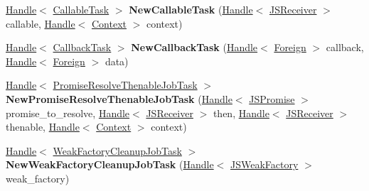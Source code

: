 \begin{DoxyCompactItemize}
\mbox{\hyperlink{classv8_1_1internal_1_1Handle}{Handle}}$<$ \mbox{\hyperlink{classv8_1_1internal_1_1CallableTask}{Callable\+Task}} $>$ {\bfseries New\+Callable\+Task} (\mbox{\hyperlink{classv8_1_1internal_1_1Handle}{Handle}}$<$ \mbox{\hyperlink{classv8_1_1internal_1_1JSReceiver}{J\+S\+Receiver}} $>$ callable, \mbox{\hyperlink{classv8_1_1internal_1_1Handle}{Handle}}$<$ \mbox{\hyperlink{classv8_1_1internal_1_1Context}{Context}} $>$ context)
\item 
\mbox{\label{classv8_1_1internal_1_1Factory_a652145336bb3edb0824d0aa5c55b48ac}} 
\mbox{\hyperlink{classv8_1_1internal_1_1Handle}{Handle}}$<$ \mbox{\hyperlink{classv8_1_1internal_1_1CallbackTask}{Callback\+Task}} $>$ {\bfseries New\+Callback\+Task} (\mbox{\hyperlink{classv8_1_1internal_1_1Handle}{Handle}}$<$ \mbox{\hyperlink{classv8_1_1internal_1_1Foreign}{Foreign}} $>$ callback, \mbox{\hyperlink{classv8_1_1internal_1_1Handle}{Handle}}$<$ \mbox{\hyperlink{classv8_1_1internal_1_1Foreign}{Foreign}} $>$ data)
\item 
\mbox{\label{classv8_1_1internal_1_1Factory_a1bb189493baa3a061447014fd77caed9}} 
\mbox{\hyperlink{classv8_1_1internal_1_1Handle}{Handle}}$<$ \mbox{\hyperlink{classv8_1_1internal_1_1PromiseResolveThenableJobTask}{Promise\+Resolve\+Thenable\+Job\+Task}} $>$ {\bfseries New\+Promise\+Resolve\+Thenable\+Job\+Task} (\mbox{\hyperlink{classv8_1_1internal_1_1Handle}{Handle}}$<$ \mbox{\hyperlink{classv8_1_1internal_1_1JSPromise}{J\+S\+Promise}} $>$ promise\+\_\+to\+\_\+resolve, \mbox{\hyperlink{classv8_1_1internal_1_1Handle}{Handle}}$<$ \mbox{\hyperlink{classv8_1_1internal_1_1JSReceiver}{J\+S\+Receiver}} $>$ then, \mbox{\hyperlink{classv8_1_1internal_1_1Handle}{Handle}}$<$ \mbox{\hyperlink{classv8_1_1internal_1_1JSReceiver}{J\+S\+Receiver}} $>$ thenable, \mbox{\hyperlink{classv8_1_1internal_1_1Handle}{Handle}}$<$ \mbox{\hyperlink{classv8_1_1internal_1_1Context}{Context}} $>$ context)
\item 
\mbox{\label{classv8_1_1internal_1_1Factory_aebb99eba9bf3514c573f7c417d99cfb3}} 
\mbox{\hyperlink{classv8_1_1internal_1_1Handle}{Handle}}$<$ \mbox{\hyperlink{classv8_1_1internal_1_1WeakFactoryCleanupJobTask}{Weak\+Factory\+Cleanup\+Job\+Task}} $>$ {\bfseries New\+Weak\+Factory\+Cleanup\+Job\+Task} (\mbox{\hyperlink{classv8_1_1internal_1_1Handle}{Handle}}$<$ \mbox{\hyperlink{classv8_1_1internal_1_1JSWeakFactory}{J\+S\+Weak\+Factory}} $>$ weak\+\_\+factory)

\end{DoxyCompactItemize}
